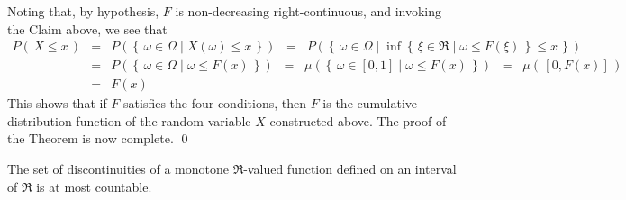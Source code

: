 Noting that, by hypothesis, $F$ is non-decreasing right-continuous, and invoking the Claim above, we see that
\begin{eqnarray*}
P\!\left(\,X \leq x\,\right)
&=& P\!\left(\left\{\,\omega\in\Omega\;\vert\; X(\omega) \leq x\,\right\}\right)
\;\;=\;\; P\!\left(\left\{\,\omega\in\Omega\;\vert\; \inf \left\{\,\xi \in \Re \;\vert\; \omega \leq F(\xi)\,\right\} \leq x\,\right\}\right)
\\
&=& P\!\left(\left\{\,\omega\in\Omega\;\vert\; \omega \leq F(x)\,\right\}\right)
\;\;=\;\; \mu\!\left(\left\{\,\omega\in [0,1] \;\vert\; \omega \leq F(x)\,\right\}\right)
\;\;=\;\; \mu\!\left(\,[0,F(x)]\,\right)
\\
&=& F(x)
\end{eqnarray*}
This shows that if $F$ satisfies the four conditions, then $F$ is the cumulative distribution function of the random variable $X$ constructed above.
The proof of the Theorem is now complete.
\qed

\begin{theorem}
\label{Thm:DarbouxFroda}
\mbox{}\vskip 0.1cm
\noindent
The set of discontinuities of a monotone $\Re$-valued function defined on an interval of $\Re$ is at most countable.
\end{theorem}

